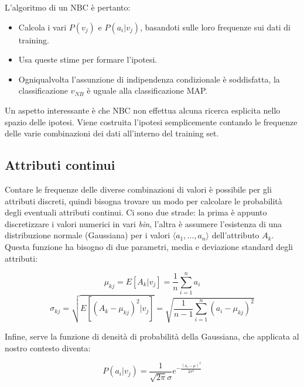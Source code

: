 L'algoritmo di un NBC è pertanto:
\begin{itemize}
	\item Calcola i vari $P(v_j)$ e $P(a_i|v_j)$, basandoti sulle loro frequenze sui dati di training.
	\item Usa queste stime per formare l'ipotesi.
	\item Ogniqualvolta l'assunzione di indipendenza condizionale è soddisfatta, la classificazione $v_{NB}$ è uguale alla classificazione MAP.
\end{itemize}

Un aspetto interessante è che NBC non effettua alcuna ricerca esplicita nello spazio delle ipotesi. Viene costruita l'ipotesi semplicemente contando le frequenze delle varie combinazioni dei dati all'interno del training set.

\subsection*{Attributi continui}
Contare le frequenze delle diverse combinazioni di valori è possibile per gli attributi discreti, quindi bisogna trovare un modo per calcolare le probabilità degli eventuali attributi continui. Ci sono due strade: la prima è appunto discretizzare i valori numerici in vari \emph{bin}, l'altra è assumere l'esistenza di una distribuzione normale (Gaussiana) per i valori $\langle a_1, ..., a_n \rangle$ dell'attributo $A_k$. Questa funzione ha bisogno di due parametri, media e deviazione standard degli attributi:

$$ \mu_{kj} = E[A_k | v_j] = \frac{1}{n} \sum_{i = 1}^{n} a_i$$
$$ \sigma_{kj} = \sqrt{ E[(A_k - \mu_{kj})^2 | v_j] } = \sqrt{ \frac{1}{n-1} \sum_{i = 1}^{n} (a_i - \mu_{kj})^2 } $$

Infine, serve la funzione di densità di probabilità della Gaussiana, che applicata al nostro contesto diventa:

$$ P(a_i | v_j) = \frac{1}{\sqrt{2\pi} \sigma} e^{-\frac{(a_i-\mu)^2}{2\sigma^2}} $$
